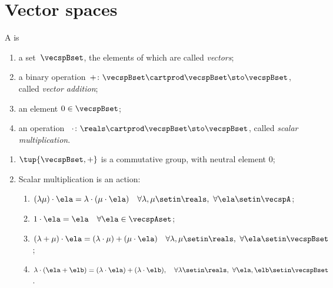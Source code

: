 
\section{Vector spaces}
\label{sec:vector-spaces}



\begin{ctdefinition}
    \label{def:real-vector-space}
    A  is
    \begin{body}
        \constit
        \begin{enumerate}
            \item a set~$\vecspBset$, the elements of which are called \emph{vectors};
            \item a binary operation~$+ \colon \vecspBset \cartprod \vecspBset \sto \vecspBset$, called \emph{vector addition};
            \item an element $0 \in \vecspBset$;
            \item an operation ~$\cdot \colon \reals \cartprod \vecspBset \sto \vecspBset$, called \emph{scalar multiplication}.
        \end{enumerate}
        \condit
        \begin{enumerate}
            \item $\tup{\vecspBset, +}$ is a commutative group, with neutral element $0$;
            \item Scalar multiplication is an action: 
            \begin{enumerate}
            \item $(\lambda \mu) \cdot \ela = \lambda \cdot( \mu \cdot \ela) \quad \forall \lambda, \mu \setin \reals, \ \forall \ela \setin \vecspA$; 
            \item $1 \cdot \ela = \ela \quad \forall \ela \in \vecspAset$;
            \item $(\lambda + \mu) \cdot \ela = (\lambda \cdot \mu) + (\mu \cdot \ela) \quad \forall \lambda, \mu \setin \reals, \ \forall \ela \setin \vecspBset$;
            \item $\lambda \cdot (\ela + \elb) = (\lambda \cdot \ela) + (\lambda \cdot \elb), \quad \forall \lambda \setin \reals, \ \forall \ela, \elb \setin \vecspBset$.
            \end{enumerate}
        \end{enumerate}
    \end{body}
\end{ctdefinition}

